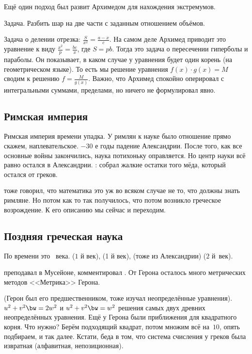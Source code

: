 \documentclass[a4paper,oneside,fleqn,10pt]{article}
\begin{document}
Ещё один подход был развит Архимедом для нахождения экстремумов.

Задача. Разбить шар на две части с заданным отношением объёмов.

Задача о делении отрезка: $\frac{S}{x^2} = \frac{a-x}{c}$.  На самом
деле Архимед приводит это уравнение к виду $\frac{x^2}{p}
=\frac{bc}{x}$, где $S = pb$.  Тогда это задача о пересечении
гиперболы и параболы. Он показывает, в каком случае у уравнения будет
один корень (на геометрическом языке). То есть мы решение уравнения
$f(x) \cdot g (x) = M$ сводим к решению $f = \frac{M}{g(x)}$.  Важно,
что Архимед спокойно оперировал с интегральными суммами, пределами, но
ничего не формулировал явно.

\subsection{Римская империя}

Римская империя времени упадка. У римлян к науке было отношение прямо
скажем, наплевательское.  $-30$ е годы падение Александрии. После
того, как все основные войны закончились, наука потихоньку
оправляется. Но центр науки всё равно остался в Александрии.
:  собрал жалкие остатки того мёда, который
остался от греков.

 тоже говорил, что математика это уж во всяком случае
не то, что должны знать римляне.  Но потом как то так получилось, что
потом возникло греческое возрождение.  К его описанию мы сейчас и
переходим.

\subsection{Поздняя греческая наука}

По времени это ~века.   ($1$ й
век),  (1 й век),  (тоже из Александрии) ($2$ й~век).

 преподавал в Мусейоне, комментировал
.  От Герона осталось много метрических методов
<<Метрика>> Герона.

 (Герон был его предшественником, тоже
изучал неопределённые уравнения).  $u^2 + v^2 \bw= 2w^2$ и $u^2 + v^2
\bw= w^2$ решения самых двух древних неопределённых уравнения.  Ещё у
Герона были приближения для квадратного корня. Что нужно? Берём
подходящий квадрат, потом множим всё на~$10$, опять подбираем, и так
далее. Кстати, беда в том, что система счисления у греков была
извратная (алфавитная, непозиционная).
\end{document}
